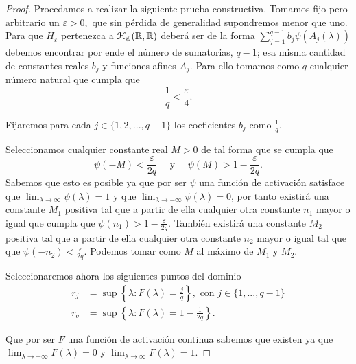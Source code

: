 \begin{proof}
    Procedamos a realizar la siguiente prueba constructiva. 
    Tomamos fijo pero arbitrario un $\varepsilon > 0,$ que sin pérdida de generalidad
    supondremos menor que uno.
    Para que $H_\varepsilon$ pertenezca a $\mathcal{H}_\psi{(\mathbb{R}, \mathbb{R})}$ deberá ser de la 
    forma $\sum^{q-1}_{j=1} b_j \psi( A_j(\lambda))$
    debemos encontrar por ende el número de sumatorias, $q-1$; esa misma cantidad de constantes reales $b_j$ y 
    funciones afines $A_j$. Para ello tomamos como $q$ cualquier número natural que cumpla que 
    \begin{equation}\label{eq:lema_a_2_def_q}
        \frac{1}{q} < \frac{\varepsilon}{4}.
    \end{equation}

    Fijaremos para cada $j \in \{1,2, ...,q-1\}$ los coeficientes  $b_j$ como $\frac{1}{q}$. 

    Seleccionamos cualquier constante real $M>0$ de tal forma que 
    se cumpla que
    \begin{equation}\label{lema_a_2_psi_m}
        \psi(-M) < \frac{\varepsilon}{2q}
        \quad \text{ y } \quad
        \psi(M) > 1 - \frac{\varepsilon}{2q}.
    \end{equation} 
    Sabemos que esto es posible ya que por ser $\psi$ una función de activación satisface que 
    $\lim_{\lambda \longrightarrow \infty} \psi(\lambda) = 1$ y que  $\lim_{\lambda \longrightarrow -\infty} \psi(\lambda) = 0$,
    por tanto existirá una constante $M_1$ positiva tal que a partir de ella cualquier
     otra constante $n_1$ mayor o igual que cumpla que 
    $\psi(n_1) > 1 - \frac{\varepsilon}{2q}$. También existirá una constante $M_2$ positiva tal que a partir de 
    ella cualquier otra constante $n_2$ mayor o igual tal que que 
    $\psi(-n_2) < \frac{\varepsilon}{2q}$. Podemos tomar como $M$ al máximo de $M_1$ y $M_2$.   

    Seleccionaremos ahora los siguientes puntos del dominio
    \begin{align}\label{lema:2_2_selección_r_F}
        r_j &= \sup \left\{ \lambda: F(\lambda) = \frac{j}{q} \right\},
         \text{ con } j \in \{1, ..., q-1\} 
         \\
        r_q &= \sup \left\{ \lambda: F(\lambda) = 1 - \frac{1}{2 q} \right\}. 
    \end{align}

    Que por ser $F$ una función de activación continua 
    sabemos que existen
    ya que $\lim_{\lambda \longrightarrow - \infty} F(\lambda) = 0$ y 
    $\lim_{\lambda \longrightarrow  \infty} F(\lambda) = 1$. 


\end{proof}
